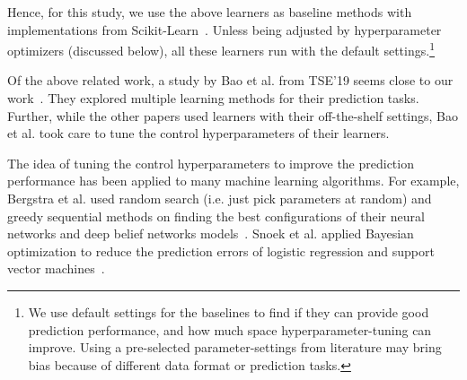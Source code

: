 \documentclass[smallextended]{svjour3}
\newcommand{\respto}[1]{
\fcolorbox{black}{black!15}{%
\label{resp:#1}%
\bf\scriptsize R{#1}}}
\newcommand{\BLUE}{\color{blue}}
\newcommand{\BLACK}{\color{black}}
\begin{document}
Hence, for this study, we use the above learners as baseline methods with implementations from Scikit-Learn~\cite{pedregosa2011scikit}. Unless being adjusted by hyperparameter optimizers (discussed below), all these learners run with the default settings.\footnote{
\BLUE
We use default settings for the baselines to find if they can provide good prediction performance, and how much space hyperparameter-tuning can improve. Using a pre-selected parameter-settings from literature may bring bias because of different data format or prediction tasks.\respto{1A}
\BLACK
}

Of the above related work, a study by 
Bao et al. from TSE'19 seems close to our work~\cite{bao2019large}. 
They explored multiple learning methods for their prediction tasks.
Further, while the other papers used learners with their off-the-shelf settings, Bao et al. took care to tune the control
hyperparameters of their learners.



The idea of tuning the control hyperparameters to improve the prediction performance has been applied to many machine learning algorithms. For example, Bergstra et al. used random search (i.e. just pick
parameters at random)
and greedy sequential methods on finding the best configurations of their neural networks and deep belief networks models~\cite{bergstra2011algorithms}. Snoek et al. applied Bayesian optimization to reduce the prediction errors of logistic regression and support vector machines~\cite{snoek2012practical}.
\end{document}
